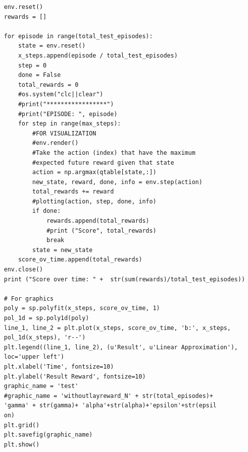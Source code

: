 \documentclass[a4paper]{report}
\theoremstyle{definition}
\theoremstyle{plain}
\theoremstyle{remark}
\theoremstyle{remark}
\theoremstyle{definition}
\begin{document}
\begin{lstlisting}[label=some-code, caption=main.py]
env.reset()
rewards = []

for episode in range(total_test_episodes):
    state = env.reset()
    x_steps.append(episode / total_test_episodes)
    step = 0
    done = False
    total_rewards = 0
    #os.system("clc||clear")
    #print("*****************")
    #print("EPISODE: ", episode)
    for step in range(max_steps):
        #FOR VISUALIZATION
        #env.render()
        #Take the action (index) that have the maximum
        #expected future reward given that state
        action = np.argmax(qtable[state,:])
        new_state, reward, done, info = env.step(action)
        total_rewards += reward
        #plotting(action, step, done, info)
        if done:
            rewards.append(total_rewards)
            #print ("Score", total_rewards)
            break
        state = new_state
    score_ov_time.append(total_rewards)
env.close()
print ("Score over time: " +  str(sum(rewards)/total_test_episodes))

# For graphics
poly = sp.polyfit(x_steps, score_ov_time, 1)
pol_1d = sp.poly1d(poly)
line_1, line_2 = plt.plot(x_steps, score_ov_time, 'b:', x_steps, pol_1d(x_steps), 'r--')
plt.legend((line_1, line_2), (u'Result', u'Linear Approximation'), loc='upper left')
plt.xlabel('Time', fontsize=10)
plt.ylabel('Result Reward', fontsize=10)
graphic_name = 'test'
#graphic_name = 'withoutlayreward_N' + str(total_episodes)+ 
'gamma' + str(gamma)+ 'alpha'+str(alpha)+'epsilon'+str(epsil
on)
plt.grid()
plt.savefig(graphic_name)
plt.show()

\end{lstlisting}
\end{document}
